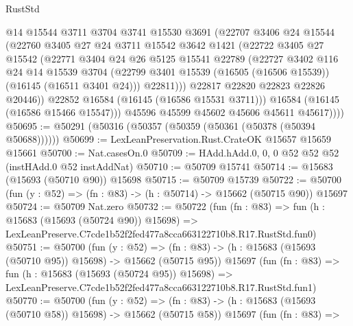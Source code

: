 \begin{lexlean}{RustStd}
\begin{coremodule}
                @14
                @15544
                @3711
                @3704
                @3741
                @15530
                @3691
                (@22707
                  @3406
                  @24
                  @15544
                  (@22760
                    @3405
                    @27
                    @24
                    @3711
                    @15542
                    @3642
                    @1421
                    (@22722
                      @3405
                      @27
                      @15542
                      (@22771
                        @3404
                        @24
                        @26
                        @5125
                        @15541
                        @22789
                        (@22727
                          @3402
                          @116
                          @24
                          @14
                          @15539
                          @3704
                          (@22799 @3401 @15539 (@16505 (@16506 @15539)) (@16145 (@16511 @3401 @24)))
                          @22811)))
                    @22817
                    @22820
                    @22823
                    @22826
                    @20446))
                @22852
                @16584
                (@16145 (@16586 @15531 @3711)))
              @16584
              (@16145 (@16586 @15466 @15547)))
            @45596
            @45599
            @45602
            @45606
            @45611
            @45617))))
@50695 := @50291 (@50316 (@50357 (@50359 (@50361 (@50378 (@50394 @50688))))))
@50699 := LexLeanPreservation.Rust.CrateOK @15657 @15659 @15661
@50700 := Nat.casesOn.{0}
@50709 := HAdd.hAdd.{0, 0, 0} @52 @52 @52 (instHAdd.{0} @52 instAddNat)
@50710 := @50709 @15741
@50714 := @15683 (@15693 (@50710 @90)) @15698
@50715 := @50709 @15739
@50722 := @50700 (fun (y : @52) => (fn : @83) -> (h : @50714) -> @15662 (@50715 @90)) @15697
@50724 := @50709 Nat.zero
@50732 := @50722
    (fun (fn : @83) =>
    fun (h : @15683 (@15693 (@50724 @90)) @15698) =>
    LexLeanPreserve.C7cde1b52f2fed477a8cca663122710b8.R17.RustStd.fun0)
@50751 := @50700
    (fun (y : @52) =>
    (fn : @83) -> (h : @15683 (@15693 (@50710 @95)) @15698) -> @15662 (@50715 @95))
    @15697
    (fun (fn : @83) =>
    fun (h : @15683 (@15693 (@50724 @95)) @15698) =>
    LexLeanPreserve.C7cde1b52f2fed477a8cca663122710b8.R17.RustStd.fun1)
@50770 := @50700
    (fun (y : @52) =>
    (fn : @83) -> (h : @15683 (@15693 (@50710 @58)) @15698) -> @15662 (@50715 @58))
    @15697
    (fun (fn : @83) =>

\end{coremodule}
\end{lexlean}
